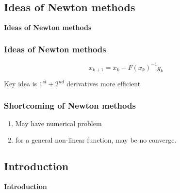 

\begin{frame}
	\section{Ideas of Newton methods}
	\begin{center}
	\begin{Huge}
	\textbf{Ideas of Newton methods}
	\end{Huge}
	\end{center}
\end{frame}


\begin{frame}
	\frametitle{Ideas of Newton methods}
	
	$$x_{k+1} = x_k - F(x_k)^{-1}g_k$$
	
	Key idea is $1^{st} + 2^{nd}$ derivatives more efficient
	
\end{frame}


\begin{frame}
	\frametitle{Shortcoming of Newton methods}
	
	\begin{enumerate}
	\item May have numerical problem
	\item for a general non-linear function, may be no converge.
	\end{enumerate}
	
\end{frame}


\begin{frame}
	\section{Introduction}
	\begin{center}
	\begin{Huge}
	\textbf{Introduction}
	\end{Huge}
	\end{center}
\end{frame}

